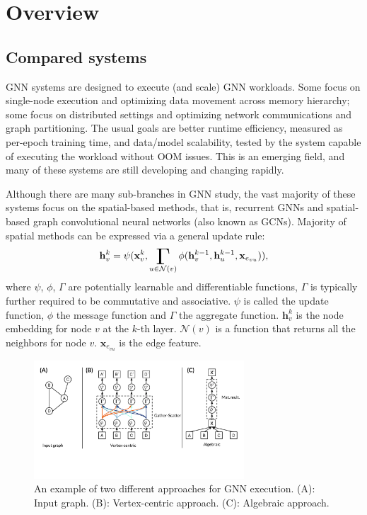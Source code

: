 

\section{Overview}
\subsection{Compared systems}
GNN systems are designed to execute (and scale) GNN workloads. Some focus on single-node execution and optimizing data movement across memory hierarchy; some focus on distributed settings and optimizing network communications and graph partitioning. The usual goals are better runtime efficiency, measured as per-epoch training time, and data/model scalability, tested by the system capable of executing the workload without OOM issues. This is an emerging field, and many of these systems are still developing and changing rapidly.

Although there are many sub-branches in GNN study, the vast majority of these systems focus on the spatial-based methods, that is, recurrent GNNs and spatial-based graph convolutional neural networks (also known as GCNs). Majority of spatial methods can be expressed via a general update rule:
\begin{gather}
\label{eq:mp}
\mathbf{h}_v ^k = \psi ( \mathbf{x}_v^k, \gammasum_{u \in {\mathcal {N}}(v)} \phi(\mathbf{h}_v^{k-1}, \mathbf{h}_u^{k-1}, \mathbf{x}_{e_{vu}})),
\end{gather} 
where $\psi$, $\phi$, $\Gamma$ are potentially learnable and differentiable functions, $\Gamma$ is typically further required to be commutative and associative. $\psi$ is called the update function, $\phi$ the message function and $\Gamma$ the aggregate function. $\mathbf{h}_v^{k}$ is the node embedding for node $v$ at the $k$-th layer. $\mathcal {N}(v)$ is a function that returns all the neighbors for node $v$. $\mathbf{x}_{e_{vu}}$ is the edge feature.

\begin{figure}[t]
 \centering
\includegraphics[width=0.70\textwidth]{./images/gnnsys.pdf}
 \caption{An example of two different approaches for GNN execution. (A): Input graph. (B): Vertex-centric approach. (C): Algebraic approach.}
 \label{fig:gnnsys}
\end{figure}

